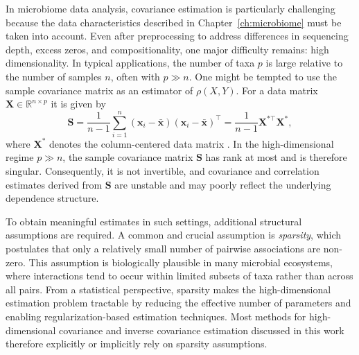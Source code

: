 In microbiome data analysis, covariance estimation is particularly challenging because the data characteristics described in Chapter~\ref{ch:microbiome} must be taken into account. Even after preprocessing to address differences in sequencing depth, excess zeros, and compositionality, one major difficulty remains: high dimensionality. In typical applications, the number of taxa $p$ is large relative to the number of samples $n$, often with $p \gg n$.
One might be tempted to use the sample covariance matrix as an estimator of $\rho(X,Y)$. For a data matrix $\mathbf{X} \in \mathbb{R}^{n \times p}$ it is given by
\begin{equation}
\mathbf{S} = \frac{1}{n-1} \sum_{i=1}^n (\mathbf{x}_i - \bar{\mathbf{x}})(\mathbf{x}_i - \bar{\mathbf{x}})^\top 
= \frac{1}{n-1} \mathbf{X}^{*\top} \mathbf{X}^*,
\end{equation}
where $\mathbf{X}^*$ denotes the column-centered data matrix \citep{hastie2009elements}.
In the high-dimensional regime $p \gg n$, the sample covariance matrix $\mathbf{S}$ has rank at most  and is therefore singular. Consequently, it is not invertible, and covariance and correlation estimates derived from $\mathbf{S}$ are unstable and may poorly reflect the underlying dependence structure.

To obtain meaningful estimates in such settings, additional structural assumptions are required. A common and crucial assumption is \emph{sparsity}, which postulates that only a relatively small number of pairwise associations are non-zero. This assumption is biologically plausible in many microbial ecosystems, where interactions tend to occur within limited subsets of taxa rather than across all pairs. From a statistical perspective, sparsity makes the high-dimensional estimation problem tractable by reducing the effective number of parameters and enabling regularization-based estimation techniques. Most methods for high-dimensional covariance and inverse covariance estimation discussed in this work therefore explicitly or implicitly rely on sparsity assumptions.

